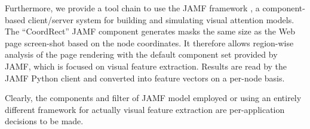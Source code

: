 Furthermore, we provide a tool chain to use the JAMF framework \cite{Steger08}, a component-based client/server system for building and simulating visual attention models.
The ``CoordRect'' JAMF component generates masks the same size as the Web page screen-shot based on the node coordinates.
It therefore allows region-wise analysis of the page rendering with the default component set provided by JAMF, which is focused on visual feature extraction.
Results are read by the JAMF Python client and converted into feature vectors on a per-node basis.

Clearly, the components and filter of JAMF model employed or using an entirely different framework for actually visual feature extraction are per-application decisions to be made.


